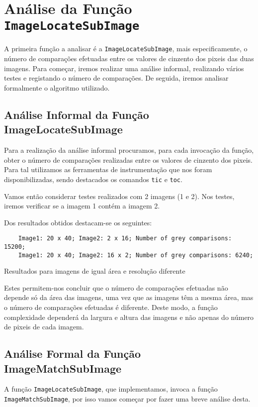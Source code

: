 \renewcommand{\listingscaption}{Caso em estudo:}

\cprotect\chapter{Análise da Função \Verb|ImageLocateSubImage|}

A primeira função a analisar é a \Verb|ImageLocateSubImage|, mais
especificamente, o número de comparações efetuadas entre os valores de
cinzento dos pixeis das duas imagens. Para começar, iremos realizar uma análise
informal, realizando vários testes e registando o número de comparações.
De seguida, iremos analisar formalmente o algoritmo utilizado.

\section{Análise Informal da Função ImageLocateSubImage}

Para a realização da análise informal procuramos, para cada invocação
da função, obter o número de comparações realizadas entre os valores de
cinzento dos pixeis. Para tal utilizamos as ferramentas de instrumentação que
nos foram disponibilizadas, sendo destacados os comandos \Verb|tic| e \Verb|toc|.

Vamos então considerar testes realizados com 2 imagens (1 e 2). Nos testes,
iremos verificar se a imagem 1 contém a imagem 2.

Dos resultados obtidos destacam-se os seguintes:

\begin{listing}[H]
	\centering
	\begin{verbatim}
	Image1: 20 x 40; Image2: 2 x 16; Number of grey comparisons: 15200;
	Image1: 20 x 40; Image2: 16 x 2; Number of grey comparisons: 6240;
  \end{verbatim}
	\caption{Resultados para imagens de igual área e resolução diferente}
\end{listing}

Estes permitem-nos concluir que o número de comparações efetuadas não depende só
da área das imagens, uma vez que as imagens têm a mesma área, mas o número de
comparações efetuadas é diferente. Deste modo, a função complexidade dependerá
da largura e altura das imagens e não apenas do número de pixeis de cada imagem.

\section{Análise Formal da Função ImageMatchSubImage}
\renewcommand{\listingscaption}{Código:}
A função \Verb|ImageLocateSubImage|, que implementamos, invoca a função
\Verb|ImageMatchSubImage|, por isso vamos começar por fazer uma breve análise
desta.

